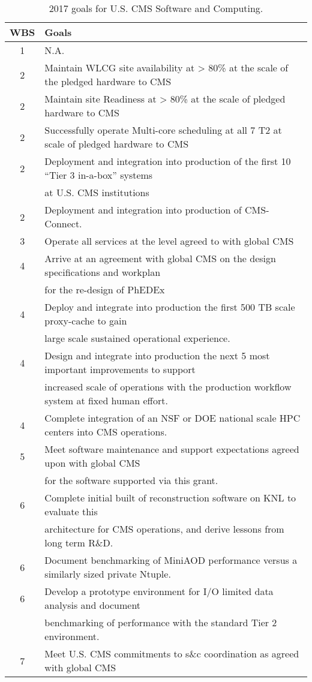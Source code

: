 \documentclass[11pt,a4paper]{article}
\begin{document}
\begin{table}
\begin{center}
\begin{tabular}{|c|l|}
\hline
WBS & Goals \\\hline
1 & N.A. \\
2 & Maintain WLCG site availability at > 80\% at the scale of the pledged hardware to CMS\\
2 & Maintain site Readiness at > 80\% at the scale of pledged hardware to CMS\\
2 & Successfully operate Multi-core scheduling at all 7 T2 at scale of pledged hardware to CMS\\
2 & Deployment and integration into production of the first 10 ``Tier 3 in-a-box'' systems\\
    & at U.S. CMS institutions\\
2 & Deployment and integration into production of CMS-Connect.\\
3 & Operate all services at the level agreed to with global CMS\\
4 & Arrive at an agreement with global CMS on the design specifications and workplan \\
    & for the re-design of PhEDEx\\
4 & Deploy and integrate into production the first 500 TB scale proxy-cache to gain \\
   & large scale sustained operational experience.\\
4 & Design and integrate into production the next 5 most important improvements to support \\
    & increased scale of operations with the production workflow system at fixed human effort.\\
4 & Complete integration of an NSF or DOE national scale HPC centers into CMS operations.\\ 
5 & Meet software maintenance and support expectations agreed upon with global CMS \\
    & for the software supported via this grant.\\
6 & Complete initial built of reconstruction software on KNL to evaluate this \\ 
    & architecture for CMS operations, and derive lessons from long term R\&D.\\
6 & Document benchmarking of MiniAOD performance versus a similarly sized private Ntuple.\\
6 & Develop a prototype environment for I/O limited data analysis and document \\
    & benchmarking of performance with the standard Tier 2 environment.\\
7 & Meet U.S. CMS commitments to s\&c coordination as agreed with global CMS\\\hline
\end{tabular}
\caption[]
{
2017 goals for U.S. CMS Software and Computing.
}
\label{scgoals}
\end{center}
\end{table}
\end{document}
